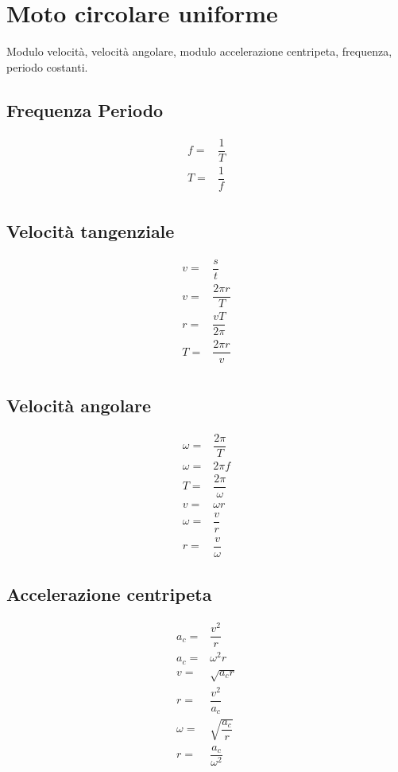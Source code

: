 \chapter{Moto circolare uniforme}
{\centering
	
	\par}
Modulo velocità, velocità angolare, modulo accelerazione centripeta, frequenza, periodo costanti. 
\section{Frequenza Periodo}
\begin{align*}
f=&\dfrac{1}{T}\\
T=&\dfrac{1}{f}\\
\end{align*}
\section{Velocità tangenziale}
\begin{align*}
v=&\dfrac{s}{t}\\
v=&\dfrac{2\pi r}{T}\\
r=&\dfrac{vT}{2\pi}\\
T=&\dfrac{2\pi r}{v}\\
\end{align*}
\section{Velocità angolare}
\begin{align*}
\omega=&\dfrac{2\pi}{T}\\
\omega=&2\pi f\\
T=&\dfrac{2\pi}{\omega}\\
v=&\omega r\\
\omega=&\dfrac{v}{r}\\
r=&\dfrac{v}{\omega}
\end{align*}
\section{Accelerazione centripeta}
\begin{align*}
a_c=&\dfrac{v^2}{r}\\
a_c=&\omega^2 r\\
v=&\sqrt{a_c r}\\
r=&\dfrac{v^2}{a_c}\\
\omega=&\sqrt{\dfrac{a_c}{r}}\\
r=&\dfrac{a_c}{\omega^2}
\end{align*}
